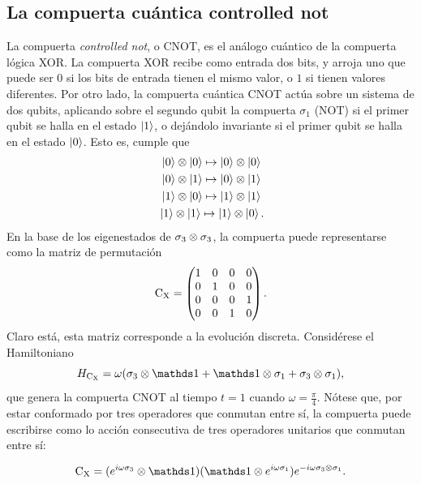 \subsection{La compuerta cuántica controlled not}

La compuerta \textit{controlled not}, o CNOT, es el análogo cuántico de la compuerta lógica XOR. La compuerta XOR recibe como entrada dos bits, y arroja uno que puede ser $0$ si los bits de entrada tienen el mismo valor, o $1$ si tienen valores diferentes. Por otro lado, la compuerta cuántica CNOT actúa sobre un sistema de dos qubits, aplicando sobre el segundo qubit la compuerta $\sigma_{1}$ (NOT) si el primer qubit se halla en el estado $\ket{1}$, o dejándolo invariante si el primer qubit se halla en el estado $\ket{0}$. Esto es, cumple que \cite{Chuang}
\begin{align*}
    \ket{0}\otimes\ket{0}\mapsto\ket{0}\otimes\ket{0}\\
    \ket{0}\otimes\ket{1}\mapsto\ket{0}\otimes\ket{1}\\
    \ket{1}\otimes\ket{0}\mapsto\ket{1}\otimes\ket{1}\\
    \ket{1}\otimes\ket{1}\mapsto\ket{1}\otimes\ket{0} \rlap{.}
\end{align*}
En la base de los eigenestados de $\sigma_{3}\otimes\sigma_{3}$, la compuerta puede representarse como la matriz de permutación
\begin{equation*}
    \text{C}_{\text{X}}=\begin{pmatrix}
        1&0&0&0\\
        0&1&0&0\\
        0&0&0&1\\
        0&0&1&0
    \end{pmatrix}.
\end{equation*}
Claro está, esta matriz corresponde a la evolución discreta. Considérese el Hamiltoniano
\begin{equation*}
  H_{\cnot}=\omega(\pauli{3}\otimes\Id+\Id\otimes\pauli{1}+\pauli{3}\otimes\pauli{1}),
\end{equation*}
que genera la compuerta CNOT al tiempo $t=1$ cuando $\omega=\frac{\pi}{4}$. Nótese que, por estar conformado por tres operadores que conmutan entre sí, la compuerta puede escribirse como lo acción consecutiva de tres operadores unitarios que conmutan entre sí:

\begin{equation*}
  \cnot=(e^{i\omega\pauli{3}}\otimes \Id) (\Id \otimes e^{i\omega\pauli{1}}) e^{-i\omega\pauli{3}\otimes\pauli{1}}.
\end{equation*}

